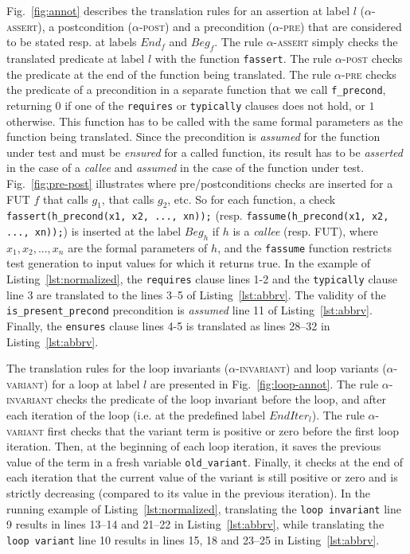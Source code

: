 Fig.~\ref{fig:annot} describes the translation rules for an assertion at label $l$
(\textsc{$\alpha$-assert}), a postcondition (\textsc{$\alpha$-post}) and
a precondition (\textsc{$\alpha$-pre})
that are considered to be stated resp. at labels $End_f$ and $Beg_f$. 
The rule \textsc{$\alpha$-assert}
simply checks the translated predicate at label $l$ with the function
\lstinline|fassert|. The rule \textsc{$\alpha$-post} checks the predicate at
the end of the function being translated. The rule \textsc{$\alpha$-pre} checks
the predicate of a precondition in a separate function that we call
\lstinline'f_precond', returning $0$ if one of the \lstinline|requires| or
\lstinline|typically| clauses does not hold, or $1$ otherwise. This function
has to be called with the same formal parameters as the function
being translated.
Since the precondition is \emph{assumed} for the function under test
and must be \emph{ensured} for a called function,
its result has to be {\em asserted} in the case
of a {\em callee}  and {\em assumed} in the case of the function under
test. 
Fig.~\ref{fig:pre-post} illustrates where
pre/postconditions checks are inserted for a FUT $f$ that calls $g_1$, that 
calls $g_2$, etc. 
So for each function, a check 
\lstinline|fassert(h_precond(x1, x2, ..., xn));| (resp.
\lstinline|fassume(h_precond(x1, x2, ..., xn));|) is inserted at the label
$Beg_h$ if $h$ is a {\em callee} (resp. FUT), where
$x_1, x_2, ..., x_n$ are the formal parameters of $h$, and
the \lstinline|fassume| function restricts 
test generation to input values for which it returns true.
In the example of Listing~\ref{lst:normalized}, the
\lstinline|requires| clause lines 1-2 and the \lstinline|typically| clause line
3 are translated to the lines 3--5 of Listing~\ref{lst:abbrv}. The validity of the
\lstinline'is_present_precond' precondition is {\em assumed} line 11 of
Listing~\ref{lst:abbrv}. Finally, the \lstinline|ensures| clause lines 4-5 is
translated as lines 28--32 in Listing~\ref{lst:abbrv}. 

The translation rules for the loop invariants (\textsc{$\alpha$-invariant}) and
loop variants (\textsc{$\alpha$-variant}) for a loop at label $l$ are presented in
Fig.~\ref{fig:loop-annot}. The rule \textsc{$\alpha$-invariant} checks the
predicate of the loop invariant before the loop, and after
each iteration of the loop (i.e. at the predefined label $EndIter_l$). The rule
\textsc{$\alpha$-variant} first checks that the variant term is positive or zero
before the first loop iteration. Then, at the beginning of each loop iteration,
it saves the previous value of the term in a fresh variable 
\lstinline|old_variant|. Finally, it checks at the end of each iteration that
the current value of the variant is still positive or zero and is strictly
decreasing (compared to its value in the previous iteration).
In the running example of Listing~\ref{lst:normalized}, translating the
\lstinline|loop invariant| line 9 results in lines 13--14 and 21--22 in
Listing~\ref{lst:abbrv}, while translating the \lstinline|loop variant| line 10
results in lines 15, 18 and 23--25 in Listing~\ref{lst:abbrv}.


